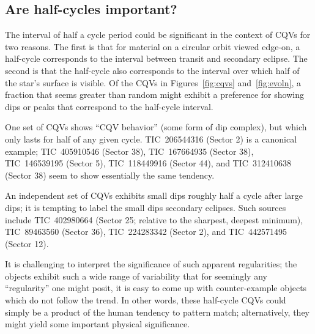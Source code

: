 \documentclass[11pt,twocolumn,tighten]{aastex63}
\begin{document}
\subsection{Are half-cycles important?}

The interval of half a cycle period could be significant in the
context of CQVs for two reasons.  The first is that for material on a
circular orbit viewed edge-on, a half-cycle corresponds to the
interval between transit and secondary eclipse.  The second is that
the half-cycle also corresponds to the interval over which half of the
star's surface is visible.  Of the CQVs in Figures~\ref{fig:cqvs}
and~\ref{fig:evoln}, a fraction that seems greater than random might
exhibit a preference for showing dips or peaks that correspond to the
half-cycle interval.

One set of CQVs shows ``CQV behavior'' (some form of dip complex), but
which only lasts for half of any given cycle.  TIC~206544316 (Sector
2) is a canonical example; TIC~405910546 (Sector 38), TIC~167664935
(Sector 38), TIC~146539195 (Sector 5), TIC~118449916 (Sector 44), and
TIC~312410638 (Sector 38) seem to show essentially the same tendency.

An independent set of CQVs exhibits small dips roughly half a cycle
after large dips; it is tempting to label the small dips secondary
eclipses.  Such sources include TIC~402980664 (Sector 25; relative to
the sharpest, deepest minimum), TIC~89463560 (Sector 36),
TIC~224283342 (Sector 2), and TIC~442571495 (Sector 12).

It is challenging to interpret the significance of such apparent
regularities;  the objects exhibit such a wide range of variability
that for seemingly any ``regularity'' one might posit, it is easy to
come up with counter-example objects which do not follow the trend.
In other words, these half-cycle CQVs could simply be a product of the
human tendency to pattern match; alternatively, they might yield some
important physical significance.
\end{document}
